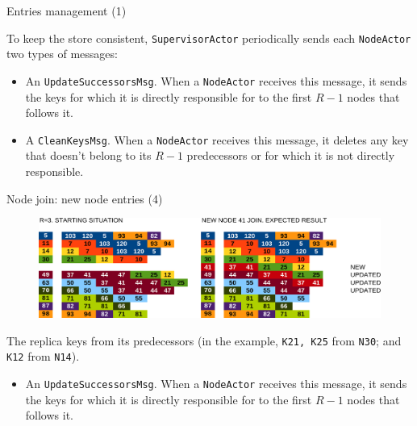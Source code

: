 \documentclass{beamer}
\begin{document}
\begin{frame}{Entries management (1)} \justify
    
    To keep the store consistent, \texttt{SupervisorActor} periodically sends each \texttt{NodeActor} two types of messages: 

    \begin{itemize}[label=$\bullet$]
        \item An \texttt{UpdateSuccessorsMsg}. When a \texttt{NodeActor} receives this message, it sends the keys for which it is directly responsible for to the first $R-1$ nodes that follows it.
        \item A \texttt{CleanKeysMsg}. When a \texttt{NodeActor} receives this message, it deletes any key that doesn't belong to its $R-1$ predecessors or for which it is not directly responsible.
    \end{itemize}

\end{frame}

\begin{frame}{Node join: new node entries (4)} \justify

    \begin{figure}
        \includegraphics[width=\linewidth]{01-NodeJoin.png}
    \end{figure}

    \item The replica keys from its predecessors (in the example, \texttt{K21, K25} from \texttt{N30}; and \texttt{K12} from \texttt{N14}).

    \begin{itemize}[label=$\bullet$]
        \item An \texttt{UpdateSuccessorsMsg}. When a \texttt{NodeActor} receives this message, it sends the keys for which it is directly responsible for to the first $R-1$ nodes that follows it.
    \end{itemize}

\end{frame}
\end{document}
